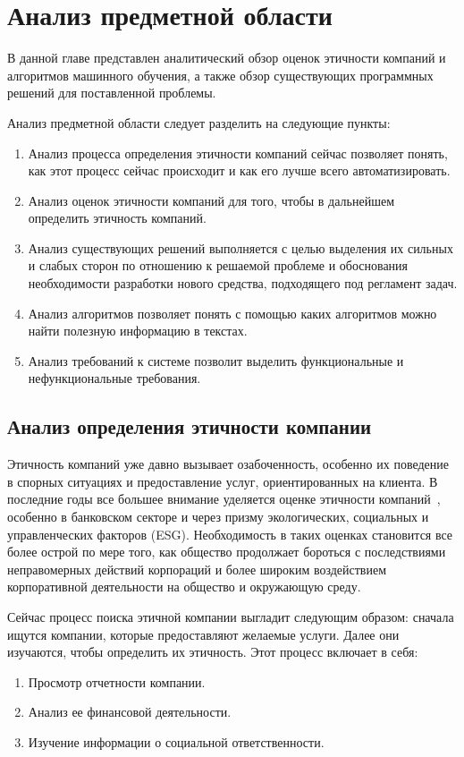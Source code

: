 \documentclass[PI, VKR]{HSEUniversity}
\begin{document}
\chapter{Анализ предметной области}
\label{sec:orgcb28634}
В данной главе представлен аналитический обзор оценок этичности компаний и алгоритмов машинного обучения, а также обзор существующих программных решений для поставленной проблемы.

Анализ предметной области следует разделить на следующие пункты:
\begin{enumerate}
\item Анализ процесса определения этичности компаний сейчас позволяет понять, как этот процесс сейчас происходит и как его лучше всего автоматизировать.
\item Анализ оценок этичности компаний для того, чтобы в дальнейшем определить этичность компаний.
\item Анализ существующих решений выполняется с целью выделения их сильных и слабых сторон по отношению к решаемой проблеме и обоснования необходимости разработки нового средства, подходящего под регламент задач.
\item Анализ алгоритмов позволяет понять с помощью каких алгоритмов можно найти полезную информацию в текстах.
\item Анализ требований к системе позволит выделить функциональные и нефункциональные требования.
\end{enumerate}
\section{Анализ определения этичности компании}
\label{sec:orgd6d8bc6}
Этичность компаний уже давно вызывает озабоченность, особенно их поведение в спорных ситуациях и предоставление услуг, ориентированных на клиента. В последние годы все большее внимание уделяется оценке этичности компаний~\autocites{mure_esg_2021}[][]{semenko_korporativnaya_2022}[][]{kudryavceva_korporativnosocialnaya_2016}, особенно в банковском секторе и через призму экологических, социальных и управленческих факторов (ESG). Необходимость в таких оценках становится все более острой по мере того, как общество продолжает бороться с последствиями неправомерных действий корпораций и более широким воздействием корпоративной деятельности на общество и окружающую среду.

Сейчас процесс поиска этичной компании выгладит следующим образом: сначала ищутся компании, которые предоставляют желаемые услуги. Далее они изучаются, чтобы определить их этичность. Этот процесс включает в себя:
\begin{enumerate}
\item Просмотр отчетности компании.
\item Анализ ее финансовой деятельности.
\item Изучение информации о социальной ответственности.
\end{enumerate}
\end{document}
